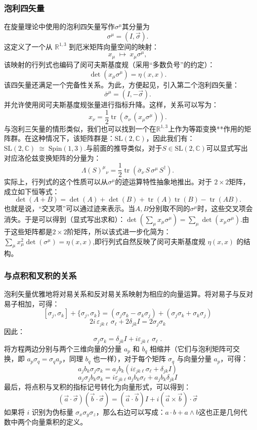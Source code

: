 \subsubsection{泡利四矢量}
在旋量理论中使用的泡利四矢量写作$\sigma^\mu$其分量为
$$
\sigma^\mu = (I, {\vec{\sigma}}).~
$$
这定义了一个从 $\mathbb{R}^{1,3}$ 到厄米矩阵向量空间的映射：
$$
x_\mu \;\mapsto\; x_\mu \sigma^\mu ,~
$$
该映射的行列式也编码了闵可夫斯基度规（采用“多数负号”的约定）：
$$
\det(x_\mu \sigma^\mu) = \eta(x, x) .~
$$
该四矢量还满足一个完备性关系。为此，方便起见，引入第二个泡利四矢量：
$$
\bar{\sigma}^\mu = (I, -{\vec{\sigma}}) .~
$$
并允许使用闵可夫斯基度规张量进行指标升降。这样，关系可以写为：
$$
x_\nu = \frac{1}{2} \operatorname{tr} \left( \bar{\sigma}_\nu \, (x_\mu \sigma^\mu) \right).~
$$
与泡利三矢量的情形类似，我们也可以找到一个在$\mathbb{R}^{1,3}$上作为等距变换**作用的矩阵群。在这种情况下，该矩阵群是：$\mathrm{SL}(2, \mathbb{C})$，因此我们有：$\mathrm{SL}(2, \mathbb{C}) \;\cong\; \mathrm{Spin}(1,3)$.与前面的推导类似，对于$S \in \mathrm{SL}(2, \mathbb{C})$可以显式写出对应洛伦兹变换矩阵的分量为：
$$
\Lambda(S)^{\mu}{}_{\nu} = 
\frac{1}{2} 
\operatorname{tr}\!\left( \bar{\sigma}_\nu \, S \, \sigma^\mu \, S^\dagger \right).~
$$
实际上，行列式的这个性质可以从$\sigma^\mu$的迹运算特性抽象地推出。对于 $2\times 2$矩阵，成立如下恒等式：
$$
\det(A+B) = \det(A) + \det(B) + \operatorname{tr}(A)\operatorname{tr}(B) - \operatorname{tr}(AB).~
$$
也就是说，“交叉项”可以通过迹来表示。当$A, B$分别取不同的$\sigma^\mu$时，这些交叉项会消失。于是可以得到（显式写出求和）：$\det\!\left( \sum_{\mu} x_\mu \sigma^\mu \right)= \sum_{\mu} \det\!\left( x_\mu \sigma^\mu \right).$由于这些矩阵都是$2\times 2$阶矩阵，所以该式进一步化简为：$\sum_{\mu} x_\mu^2 \det(\sigma^\mu)=\eta(x, x)$,即行列式自然反映了闵可夫斯基度规 $\eta(x,x)$ 的结构。
\subsubsection{与点积和叉积的关系}
泡利矢量优雅地将对易关系和反对易关系映射为相应的向量运算。将对易子与反对易子相加，可得：
$$
[\sigma_j, \sigma_k] + \{\sigma_j, \sigma_k\}
= (\sigma_j \sigma_k - \sigma_k \sigma_j) + (\sigma_j \sigma_k + \sigma_k \sigma_j)~
$$
$$
2 i \, \varepsilon_{jk\ell} \, \sigma_\ell + 2 \delta_{jk} I = 2 \sigma_j \sigma_k~
$$
因此：
$$
\sigma_j \sigma_k = \delta_{jk} I + i \varepsilon_{jk\ell} \, \sigma_\ell \;.~
$$
将方程两边分别与两个三维向量的分量 $a_p$ 和 $b_q$ 相缩并（它们与泡利矩阵可交换，即 $a_p \sigma_q = \sigma_q a_p$，同理 $b_q$ 也一样），对于每个矩阵 $\sigma_q$ 与向量分量 $a_p$，可得：
$$
a_j b_k \sigma_j \sigma_k 
= a_j b_k \left( i \varepsilon_{jk\ell} \sigma_\ell + \delta_{jk} I \right)~
$$
$$
a_j \sigma_j b_k \sigma_k
= i \varepsilon_{jk\ell} a_j b_k \sigma_\ell + a_j b_k \delta_{jk} I~
$$
最后，将点积与叉积的指标记号转化为向量形式，可以得到：
$$
(\vec{a} \cdot \vec{\sigma})(\vec{b} \cdot \vec{\sigma})
= (\vec{a} \cdot \vec{b}) I
+ i (\vec{a} \times \vec{b}) \cdot \vec{\sigma}~
$$
如果将 $i$ 识别为伪标量 $\sigma_x \sigma_y \sigma_z$，那么右边可以写成：$
a \cdot b + a \wedge b$这也正是几何代数中两个向量乘积的定义。


